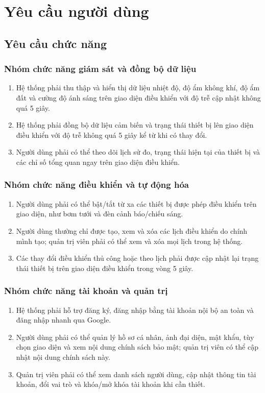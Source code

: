 \section{Yêu cầu người dùng}
\subsection{Yêu cầu chức năng}
\subsubsection{Nhóm chức năng giám sát và đồng bộ dữ liệu}
\begin{enumerate}[label = {\arabic*.}, leftmargin = 1cm]
	\item Hệ thống phải thu thập và hiển thị dữ liệu nhiệt độ, độ ẩm không khí, độ ẩm đất và cường độ ánh sáng trên giao diện điều khiển với độ trễ cập nhật không quá 5 giây.
	\item Hệ thống phải đồng bộ dữ liệu cảm biến và trạng thái thiết bị lên giao diện điều khiển với độ trễ không quá 5 giây kể từ khi có thay đổi.
	\item Người dùng phải có thể theo dõi lịch sử đo, trạng thái hiện tại của thiết bị và các chỉ số tổng quan ngay trên giao diện điều khiển.
\end{enumerate}
\subsubsection{Nhóm chức năng điều khiển và tự động hóa}
\begin{enumerate}[label = {\arabic*.}, leftmargin = 1cm]
	\item Người dùng phải có thể bật/tắt từ xa các thiết bị được phép điều khiển trên giao diện, như bơm tưới và đèn cảnh báo/chiếu sáng.
	\item Người dùng thường chỉ được tạo, xem và xóa các lịch điều khiển do chính mình tạo; quản trị viên phải có thể xem và xóa mọi lịch trong hệ thống.
	\item Các thay đổi điều khiển thủ công hoặc theo lịch phải được cập nhật lại trạng thái thiết bị trên giao diện điều khiển trong vòng 5 giây.
\end{enumerate}
\subsubsection{Nhóm chức năng tài khoản và quản trị}
\begin{enumerate}[label = {\arabic*.}, leftmargin = 1cm]
	\item Hệ thống phải hỗ trợ đăng ký, đăng nhập bằng tài khoản nội bộ an toàn và đăng nhập nhanh qua Google.
	\item Người dùng phải có thể quản lý hồ sơ cá nhân, ảnh đại diện, mật khẩu, tùy chọn giao diện và xem nội dung chính sách bảo mật; quản trị viên có thể cập nhật nội dung chính sách này.
	\item Quản trị viên phải có thể xem danh sách người dùng, cập nhật thông tin tài khoản, đổi vai trò và khóa/mở khóa tài khoản khi cần thiết.
\end{enumerate}
